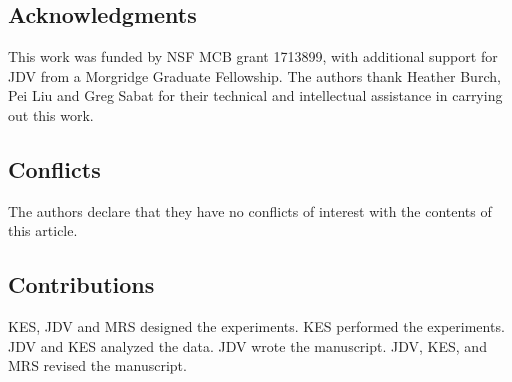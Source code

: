 \documentclass[11pt,letter]{article}\usepackage[]{graphicx}\usepackage[]{color}
\begin{document}

\subsection*{Acknowledgments}
This work was funded by NSF MCB grant 1713899, with additional support for JDV
from a Morgridge Graduate Fellowship. The authors thank Heather Burch, Pei Liu
and Greg Sabat for their technical and intellectual assistance in carrying out
this work.
%
\subsection*{Conflicts} The authors declare that they have no conflicts of
interest with the contents of this article.
%
\subsection*{Contributions} KES, JDV and MRS designed the experiments. KES
performed the experiments. JDV and KES analyzed the data. JDV wrote the
manuscript. JDV, KES, and MRS revised the manuscript.


\end{document}
